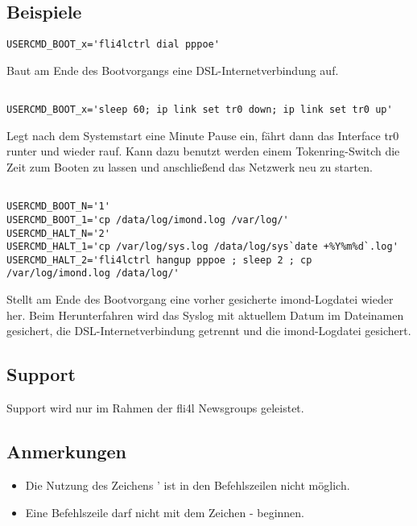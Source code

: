 \subsection{Beispiele}

\begin{verbatim}
USERCMD_BOOT_x='fli4lctrl dial pppoe'
\end{verbatim}
Baut am Ende des Bootvorgangs eine DSL-Internetverbindung auf.


\begin{verbatim}

USERCMD_BOOT_x='sleep 60; ip link set tr0 down; ip link set tr0 up'
\end{verbatim}
Legt nach dem Systemstart eine Minute Pause ein, fährt dann das Interface tr0 runter
und wieder rauf. Kann dazu benutzt werden einem Tokenring-Switch die Zeit
zum Booten zu lassen und anschließend das Netzwerk neu zu starten.


\begin{verbatim}

USERCMD_BOOT_N='1'
USERCMD_BOOT_1='cp /data/log/imond.log /var/log/'
USERCMD_HALT_N='2'
USERCMD_HALT_1='cp /var/log/sys.log /data/log/sys`date +%Y%m%d`.log'
USERCMD_HALT_2='fli4lctrl hangup pppoe ; sleep 2 ; cp /var/log/imond.log /data/log/'
\end{verbatim}
Stellt am Ende des Bootvorgang eine vorher gesicherte imond-Logdatei wieder her.
Beim Herunterfahren wird das Syslog mit aktuellem Datum im Dateinamen gesichert,
die DSL-Internetverbindung getrennt und die imond-Logdatei gesichert.

\subsection{Support}
Support wird nur im Rahmen der fli4l Newsgroups geleistet.

\subsection{Anmerkungen}
\begin{itemize}
    \item Die Nutzung des Zeichens \glqq{}'\grqq{} ist in den Befehlszeilen nicht möglich.
    \item Eine Befehlszeile darf nicht mit dem Zeichen \glqq{}-\grqq{} beginnen.
\end{itemize}




